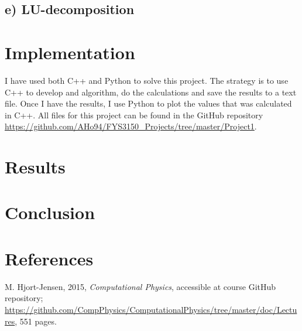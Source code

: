 \documentclass[12pt]{article}
\begin{document}
\subsection*{e) LU-decomposition}

\section{Implementation}
I have used both C++ and Python to solve this project. The strategy is to use C++ to develop and algorithm, do the calculations and save the results to a text file. Once I have the results, I use Python to plot the values that was calculated in C++. All files for this project can be found in the GitHub repository \url{https://github.com/AHo94/FYS3150_Projects/tree/master/Project1}.

\section{Results}
\section{Conclusion}
\section{References}
M. Hjort-Jensen, 2015, \textit{Computational Physics}, accessible at course GitHub repository; \url{https://github.com/CompPhysics/ComputationalPhysics/tree/master/doc/Lectures}, 551 pages.
\end{document}
